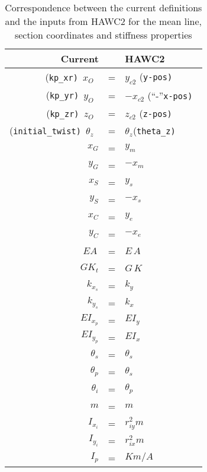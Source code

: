 \documentclass[11pt]{article}
\newcommand{\sh}{{S}}
\newcommand{\cent}{{C}}
\newcommand{\EA}{{E\!A}\,}
\newcommand{\EI}{E\!I}
\newcommand{\GK}{G\!K_t}
\begin{document}
\begin{table}[!h]\centering
    \caption{Correspondence between the current definitions and the inputs from HAWC2 for the mean line, section coordinates and stiffness properties}
    \label{tab:MeanLineHawc2}
\begin{tabular}{rcl}
  \textbf{Current}    &   & \textbf{HAWC2}                \\
    \hline
(\tt{kp\_xr}) $x_O$     & = & $ y_{c2}$    (\tt{y-pos}) \\
(\tt{kp\_yr}) $y_O$     & = & $ -x_{c2}$   (``-''\tt{x-pos}) \\
(\tt{kp\_zr}) $z_O$     & = & $ z_{c2}$    (\tt{z-pos}) \\
(\tt{initial\_twist}) $\theta_{z}$ & = & $ \theta_{z}$(\tt{theta\_z}) \\
    \hline
 $x_G$   & = & $ y_{m}$  \\
 $y_G$   & = & $ -x_{m}$ \\
 $x_\sh$ & = & $ y_{s}$  \\
 $y_\sh$ & = & $ -x_{s}$ \\
 $x_\cent$ & = & $ y_{e}$  \\
 $y_\cent$ & = & $ -x_{e}$ \\
\hline
 $\EA$       & = & $ E\, A$   \\
 $\GK$       & = & $ G\, K$   \\
 $k_{x_s}$       & = & $ k_y  $   \\
 $k_{y_s}$       & = & $ k_x  $   \\
 $\EI_{x_p}$ & = & $ E I_y  $ \\
 $\EI_{y_p}$ & = & $ E I_x  $ \\
 $\theta_s$ & = & $ \theta_s$ \\
 $\theta_p$ & = & $ \theta_s$ \\
\hline
 $\theta_i$ & = & $ \theta_p$ \\
 $m$ &        = & $m$ \\
 $I_{x_i}$ &   = & $r_{iy}^2 m$ \\
 $I_{y_i}$ &   = & $r_{ix}^2 m$ \\
 $I_{p}$   &   = & $K  m / A$\\
\hline
 \end{tabular}
\end{table}
\end{document}
